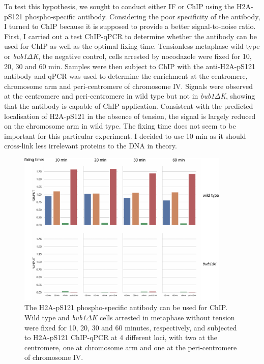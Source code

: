 To test this hypothesis, we sought to conduct either IF or ChIP using the H2A-pS121 phospho-specific antibody. Considering the poor specificity of the antibody, I turned to ChIP because it is supposed to provide a better signal-to-noise ratio. First, I carried out a test ChIP-qPCR to determine whether the antibody can be used for ChIP as well as the optimal fixing time. Tensionless metaphase wild type or \textit{bub1$\Delta$K}, the negative control, cells arrested by nocodazole were fixed for 10, 20, 30 and 60 \si{\minute}. Samples were then subject to ChIP with the anti-H2A-pS121 antibody and qPCR was used to determine the enrichment at the centromere, chromosome arm and peri-centromere of chromosome IV. Signals were observed at the centromere and peri-centromere in wild type but not in \textit{bub1$\Delta$K}, showing that the antibody is capable of ChIP application. Consistent with the predicted localisation of H2A-pS121 in the absence of tension, the signal is largely reduced on the chromosome arm in wild type. The fixing time does not seem to be important for this particular experiment. I decided to use 10 \si{\minute} as it should cross-link less irrelevant proteins to the DNA in theory. 

\begin{figure}[htbp]
  \centering
  \includegraphics[width=0.9\textwidth]{chapter3/figures/test_qPCR.pdf}
  \caption[The H2A-pS121 phospho-specific antibody can be used for ChIP]{The H2A-pS121 phospho-specific antibody can be used for ChIP. Wild type and \textit{bub1$\Delta$K} cells arrested in metaphase without tension were fixed for 10, 20, 30 and 60 minutes, respectively, and subjected to H2A-pS121 ChIP-qPCR at 4 different loci, with two at the centromere, one at chromosome arm and one at the peri-centromere of chromosome IV. }
  \label{fig:ph2atestchipqpcr}
\end{figure}

